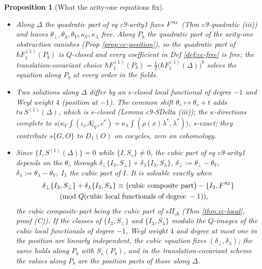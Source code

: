 \documentclass[11pt]{article}
\numberwithin{equation}{section}
\theoremstyle{plain}
\newtheorem{proposition}[theorem]{Proposition}
\theoremstyle{definition}
\newcommand{\AV}{A|_V}
\begin{document}
\begin{proposition}[What the arity-one equations fix]
\label{prop:cc-arity1}
\begin{itemize}
\item[(i)] Along $\Delta$ the quadratic part of eq c9-arity1 fixes $F'^{\rm tr}$ (Thm c9-quadratic (iii)) and leaves $\theta_\perp,\theta_\lambda,\theta_V,\kappa_V,\kappa_\lambda$ free. Along $P_b$ the quadratic part of the arity-one obstruction vanishes (Prop \ref{prop:cc-position}), so the quadratic part of $\hbar F_1^{(1)}(P_b)$ is $Q$-closed and every coefficient in Def \ref{def:cc-free} is free; the translation-covariant choice $\hbar F_1^{(1)}(P_b)=\tfrac12\big(\hbar F_1^{(1)}(\Delta)\big)^b$ solves the equation along $P_b$ at every order in the fields.
\item[(ii)] Two solutions along $\Delta$ differ by an $s$-closed local functional of degree $-1$ and Weyl weight $4$ (position at $-1$). The common shift $\theta_\diamond\mapsto\theta_\diamond+t$ adds $tu\,S^{(1)}(\Delta)$, which is $s$-closed (Lemma c9-SDelta (iii)); the $\kappa$-directions complete to $s\big(\kappa_V\int(\iota_x\AV,c^*)+\kappa_\lambda\int(\rho(x)\lambda^*,\lambda^*)\big)$, $s$-exact; they contribute $s\{G,O\}$ to $D_1(O)$ on cocycles, zero on cohomology.
\item[(iii)] Since $\{I,S^{(1)}(\Delta)\}=0$ while $\{I,S_\diamond\}\neq0$, the cubic part of eq c9-arity1 depends on the $\theta_\diamond$ through $\delta_\perp\{I_3,S_\perp\}+\delta_\lambda\{I_3,S_\lambda\}$, $\delta_\perp:=\theta_\perp-\theta_V$, $\delta_\lambda:=\theta_\lambda-\theta_V$, $I_3$ the cubic part of $I$. It is solvable exactly when
\[
\begin{aligned}
&\delta_\perp\{I_3,S_\perp\}+\delta_\lambda\{I_3,S_\lambda\}\equiv\big(\text{cubic composite part}\big)-\{I_3,F'^{\rm tr}\}\\
&\qquad\pmod{Q(\text{cubic local functionals of degree }-1)},
\end{aligned}
\]
the cubic composite part being the cubic part of $s\Pi_\Delta$ (Thm \ref{thm:cc-local}, proof (C)). If the classes of $\{I_3,S_\perp\}$ and $\{I_3,S_\lambda\}$ modulo the $Q$-images of the cubic local functionals of degree $-1$, Weyl weight $4$ and degree at most one in the position are linearly independent, the cubic equation fixes $(\delta_\perp,\delta_\lambda)$; the same holds along $P_b$ with $S_\diamond(P_b)$, and in the translation-covariant scheme the values along $P_b$ are the position parts of those along $\Delta$.
\end{itemize}
\end{proposition}
\end{document}
